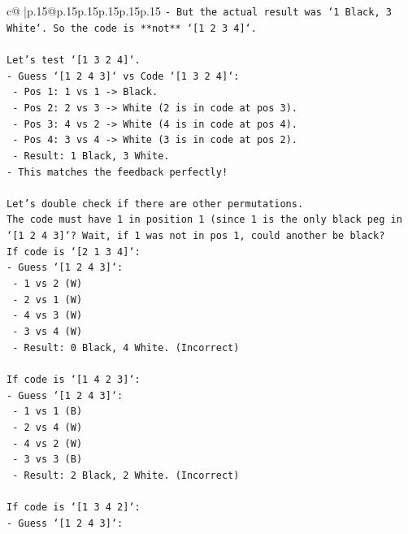 \documentclass{article}
\begin{document}
{\begin{supertabular}{c@{$\;$}|p{.15\linewidth}@{}p{.15\linewidth}p{.15\linewidth}p{.15\linewidth}p{.15\linewidth}p{.15\linewidth}}
{{{\texttt{{-} But the actual result was `1 Black, 3 White`. So the code is **not** `{[}1 2 3 4{]}`.} \\
\\ 
\texttt{Let's test `{[}1 3 2 4{]}`.} \\
\texttt{{-} Guess `{[}1 2 4 3{]}` vs Code `{[}1 3 2 4{]}`:} \\
\texttt{  {-} Pos 1: 1 vs 1 {-}> Black.} \\
\texttt{  {-} Pos 2: 2 vs 3 {-}> White (2 is in code at pos 3).} \\
\texttt{  {-} Pos 3: 4 vs 2 {-}> White (4 is in code at pos 4).} \\
\texttt{  {-} Pos 4: 3 vs 4 {-}> White (3 is in code at pos 2).} \\
\texttt{  {-} Result: 1 Black, 3 White.} \\
\texttt{{-} This matches the feedback perfectly!} \\
\\ 
\texttt{Let's double check if there are other permutations.} \\
\texttt{The code must have 1 in position 1 (since 1 is the only black peg in `{[}1 2 4 3{]}`? Wait, if 1 was not in pos 1, could another be black?} \\
\texttt{If code is `{[}2 1 3 4{]}`:} \\
\texttt{{-} Guess `{[}1 2 4 3{]}`:} \\
\texttt{  {-} 1 vs 2 (W)} \\
\texttt{  {-} 2 vs 1 (W)} \\
\texttt{  {-} 4 vs 3 (W)} \\
\texttt{  {-} 3 vs 4 (W)} \\
\texttt{  {-} Result: 0 Black, 4 White. (Incorrect)} \\
\\ 
\texttt{If code is `{[}1 4 2 3{]}`:} \\
\texttt{{-} Guess `{[}1 2 4 3{]}`:} \\
\texttt{  {-} 1 vs 1 (B)} \\
\texttt{  {-} 2 vs 4 (W)} \\
\texttt{  {-} 4 vs 2 (W)} \\
\texttt{  {-} 3 vs 3 (B)} \\
\texttt{  {-} Result: 2 Black, 2 White. (Incorrect)} \\
\\ 
\texttt{If code is `{[}1 3 4 2{]}`:} \\
\texttt{{-} Guess `{[}1 2 4 3{]}`:} \\
}}}
\end{supertabular}}
\end{document}
